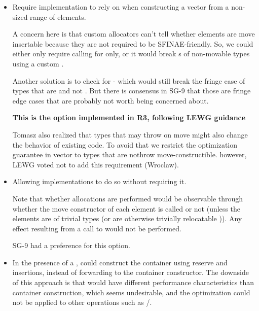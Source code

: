\documentclass{wg21}
\begin{document}
\begin{itemize}
\item Require implementation to rely on  when constructing a vector from a non-sized range of  elements.

A concern here is that custom allocators can't tell whether elements are move insertable because they are not required to be SFINAE-friendly.
So, we could either only require calling  for  only, or it would break s of non-movable types using a custom .

Another solution is to check for  - which would still break the fringe case of types that are  and not .
But there is consensus in SG-9 that those are fringe edge cases that are probably not worth being concerned about.

\textbf{This is the option implemented in R3, following LEWG guidance}

Tomasz also realized that types that may throw on move might also change the behavior of existing code.
To avoid that we restrict the optimization guarantee in vector to types that are nothrow move-constructible. however, LEWG voted not to add this requirement (Wroclaw).

\item Allowing implementations to do so without requiring it.

    Note that whether allocations are performed would be observable through whether the move constructor of each element is called or not (unless the elements are of trivial types (or are otherwise trivially relocatable )). Any effect resulting from a call to  would not be performed.

    SG-9 had a preference for this option.

\item In the presence of a ,  could construct the container using reserve and insertions, instead of forwarding to the container constructor.
    The downside of this approach is that  would have different performance characteristics than container construction, which seems undesirable, and the optimization could not be applied to other operations such as /.
\end{itemize}
\end{document}
